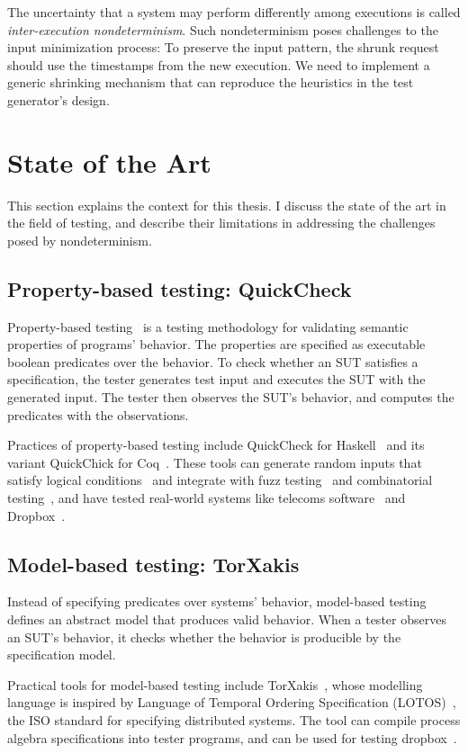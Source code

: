 The uncertainty that a system may perform differently among executions is called
{\em inter-execution nondeterminism}.  Such nondeterminism poses challenges to
the input minimization process: To preserve the input pattern, the shrunk \http
request should use the timestamps from the new execution.  We need to implement
a generic shrinking mechanism that can reproduce the heuristics in the test
generator's design.

\section{State of the Art}
\label{sec:existing-work}
This section explains the context for this thesis.  I discuss the state of the
art in the field of testing, and describe their limitations in addressing the
challenges posed by nondeterminism.

\subsection{Property-based testing: QuickCheck}
Property-based testing~\cite{pbt} is a testing methodology for validating
semantic properties of programs' behavior.  The properties are specified as
executable boolean predicates over the behavior.  To check whether an SUT
satisfies a specification, the tester generates test input and executes the SUT
with the generated input.  The tester then observes the SUT's behavior, and
computes the predicates with the observations.

Practices of property-based testing include QuickCheck for Haskell~\cite{qc} and
its variant QuickChick for Coq~\cite{quickchick}.  These tools can generate
random inputs that satisfy logical conditions~\cite{gengood} and integrate with
fuzz testing~\cite{fuzzchick} and combinatorial testing~\cite{judge-cover}, and
have tested real-world systems like telecoms software~\cite{Quviq2006} and
Dropbox~\cite{testing-dropbox}.

\subsection{Model-based testing: TorXakis}
Instead of specifying predicates over systems' behavior, model-based
testing~\cite{broy2005model} defines an abstract model that produces valid behavior.  When
a tester observes an SUT's behavior, it checks whether the behavior is
producible by the specification model.

Practical tools for model-based testing include TorXakis~\cite{TorXakis}, whose
modelling language is inspired by Language of Temporal Ordering Specification
(LOTOS)~\cite{lotos}, the ISO standard for specifying distributed systems.  The
tool can compile process algebra specifications into tester programs, and can be
used for testing dropbox~\cite{torxakis-dropbox}.

